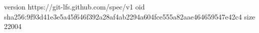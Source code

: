 version https://git-lfs.github.com/spec/v1
oid sha256:9f93d41e3e5a45f646f392a28af4ab2294a604fce555a82aae464659547e42c4
size 22004
